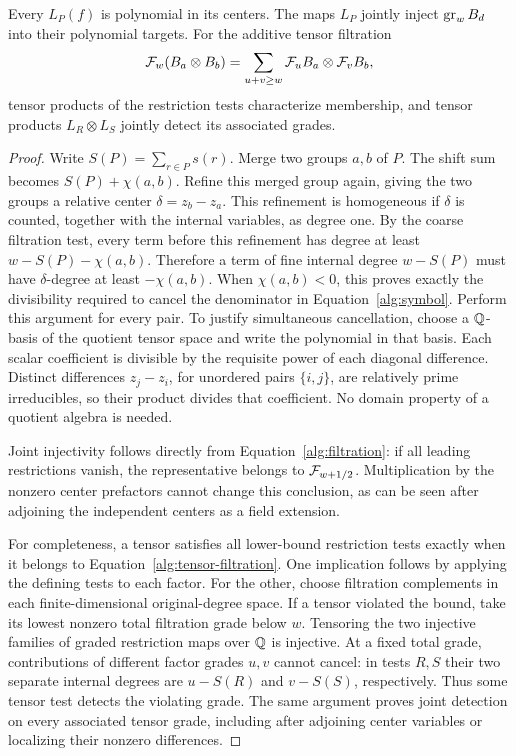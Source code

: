 \begin{lemma}\label{alg:detection}
Every $L_P(f)$ is polynomial in its centers.  The maps $L_P$ jointly
inject $\operatorname{gr}_wB_d$ into their polynomial targets.  For the additive
tensor filtration
\begin{equation}\label{alg:tensor-filtration}
 \mathcal F_w(B_a\otimes B_b)
    =\sum_{u+v\ge w}\mathcal F_uB_a\otimes\mathcal F_vB_b,
\end{equation}
tensor products of the restriction tests characterize membership,
and tensor products $L_R\otimes L_S$ jointly detect its associated
grades.
\end{lemma}

\begin{proof}
Write $S(P)=\sum_{r\in P}s(r)$.  Merge two groups $a,b$ of $P$.
The shift sum becomes $S(P)+\chi(a,b)$.  Refine this merged group
again, giving the two groups a relative center $\delta=z_b-z_a$.
This refinement is homogeneous if $\delta$ is counted, together with
the internal variables, as degree one.  By the coarse filtration
test, every term before this refinement has degree at least
$w-S(P)-\chi(a,b)$.  Therefore a term of fine internal degree
$w-S(P)$ must have $\delta$-degree at least $-\chi(a,b)$.
When $\chi(a,b)<0$, this proves exactly the divisibility required to
cancel the denominator in Equation~\eqref{alg:symbol}.
Perform this argument for every pair.  To justify simultaneous
cancellation, choose a $\mathbb Q$-basis of the quotient tensor space and
write the polynomial in that basis.  Each scalar coefficient is
divisible by the requisite power of each diagonal difference.
Distinct differences $z_j-z_i$, for unordered pairs $\{i,j\}$, are
relatively prime irreducibles, so their product divides that
coefficient.  No domain property of a quotient algebra is needed.

Joint injectivity follows directly from
Equation~\eqref{alg:filtration}: if all leading restrictions vanish,
the representative belongs to $\mathcal F_{w+1/2}$.  Multiplication by the
nonzero center prefactors cannot change this conclusion, as can be
seen after adjoining the independent centers as a field extension.

For completeness, a tensor satisfies all lower-bound restriction
tests exactly when it belongs to Equation~\eqref{alg:tensor-filtration}.
One implication follows by applying the defining tests to each
factor.  For the other, choose filtration complements in each
finite-dimensional original-degree space.  If a tensor violated the
bound, take its lowest nonzero total filtration grade below $w$.
Tensoring the two injective families of graded restriction maps over
$\mathbb Q$ is injective.  At a fixed total grade, contributions of
different factor grades $u,v$ cannot cancel: in tests $R,S$ their two
separate internal degrees are
$u-S(R)$ and $v-S(S)$, respectively.  Thus some tensor test detects
the violating grade.  The same argument proves joint detection on
every associated tensor grade, including after adjoining center
variables or localizing their nonzero differences.
\end{proof}

